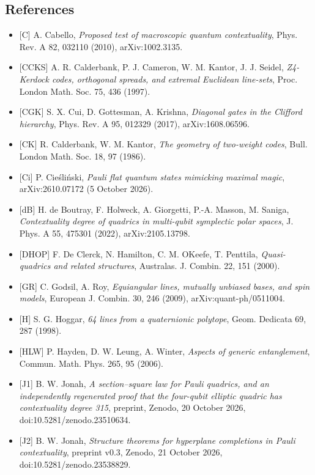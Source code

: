 \documentclass[11pt,a4paper]{article}
\providecommand{\tightlist}{\setlength{\itemsep}{0pt}\setlength{\parskip}{0pt}}
\begin{document}
\subsection{References}\label{references}

\begin{itemize}
\tightlist
\item
  {[}C{]} A. Cabello, \emph{Proposed test of macroscopic quantum contextuality}, Phys. Rev. A 82, 032110 (2010), arXiv:1002.3135.
\item
  {[}CCKS{]} A. R. Calderbank, P. J. Cameron, W. M. Kantor, J. J. Seidel, \emph{Z4-Kerdock codes, orthogonal spreads, and extremal Euclidean line-sets}, Proc. London Math. Soc. 75, 436 (1997).
\item
  {[}CGK{]} S. X. Cui, D. Gottesman, A. Krishna, \emph{Diagonal gates in the Clifford hierarchy}, Phys. Rev. A 95, 012329 (2017), arXiv:1608.06596.
\item
  {[}CK{]} R. Calderbank, W. M. Kantor, \emph{The geometry of two-weight codes}, Bull. London Math. Soc. 18, 97 (1986).
\item
  {[}Ci{]} P. Cieśliński, \emph{Pauli flat quantum states mimicking maximal magic}, arXiv:2610.07172 (5 October 2026).
\item
  {[}dB{]} H. de Boutray, F. Holweck, A. Giorgetti, P.-A. Masson, M. Saniga, \emph{Contextuality degree of quadrics in multi-qubit symplectic polar spaces}, J. Phys. A 55, 475301 (2022), arXiv:2105.13798.
\item
  {[}DHOP{]} F. De Clerck, N. Hamilton, C. M. O\textquotesingle Keefe, T. Penttila, \emph{Quasi-quadrics and related structures}, Australas. J. Combin. 22, 151 (2000).
\item
  {[}GR{]} C. Godsil, A. Roy, \emph{Equiangular lines, mutually unbiased bases, and spin models}, European J. Combin. 30, 246 (2009), arXiv:quant-ph/0511004.
\item
  {[}H{]} S. G. Hoggar, \emph{64 lines from a quaternionic polytope}, Geom. Dedicata 69, 287 (1998).
\item
  {[}HLW{]} P. Hayden, D. W. Leung, A. Winter, \emph{Aspects of generic entanglement}, Commun. Math. Phys. 265, 95 (2006).
\item
  {[}J1{]} B. W. Jonah, \emph{A section--square law for Pauli quadrics, and an independently regenerated proof that the four-qubit elliptic quadric has contextuality degree 315}, preprint, Zenodo, 20 October 2026, doi:10.5281/zenodo.23510634.
\item
  {[}J2{]} B. W. Jonah, \emph{Structure theorems for hyperplane completions in Pauli contextuality}, preprint v0.3, Zenodo, 21 October 2026, doi:10.5281/zenodo.23538829.

\end{itemize}
\end{document}
